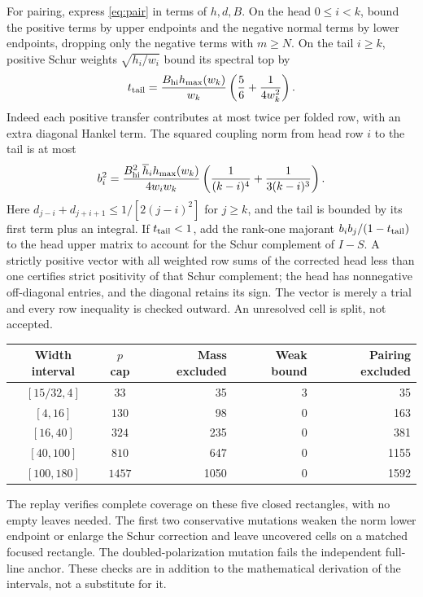 \documentclass[11pt]{article}
\begin{document}
For pairing, express \eqref{eq:pair} in terms of $h,d,B$. On the head $0\le i<k$, bound the positive terms by upper endpoints and the negative normal terms by lower endpoints, dropping only the negative terms with $m\ge N$. On the tail $i\ge k$, positive Schur weights $\sqrt{h_i/w_i}$ bound its spectral top by
\[
 t_{\rm tail}=\frac{B_{\rm hi} h_{\max}(w_k)}{w_k}
          \left(\frac56+\frac1{4w_k^2}\right).
\]
Indeed each positive transfer contributes at most twice per folded row, with an extra diagonal Hankel term. The squared coupling norm from head row $i$ to the tail is at most
\[
 b_i^2=\frac{B_{\rm hi}^2\,\overline h_i h_{\max}(w_k)}{4w_iw_k}
         \left(\frac1{(k-i)^4}+\frac1{3(k-i)^3}\right).
\]
Here $d_{j-i}+d_{j+i+1}\le1/[2(j-i)^2]$ for $j\ge k$, and the tail is bounded by its first term plus an integral. If $t_{\rm tail}<1$, add the rank-one majorant $b_i b_j/(1-t_{\rm tail})$ to the head upper matrix to account for the Schur complement of $I-S$. A strictly positive vector with all weighted row sums of the corrected head less than one certifies strict positivity of that Schur complement; the head has nonnegative off-diagonal entries, and the diagonal retains its sign. The vector is merely a trial and every row inequality is checked outward. An unresolved cell is split, not accepted.

\begin{center}
\begin{tabular}{ccrrr}
\toprule
Width interval & $p$ cap & Mass excluded & Weak bound & Pairing excluded\\
\midrule
$[15/32,4]$ & $33$   & 35   & 3 & 35\\
$[4,16]$ & $130$     & 98   & 0 & 163\\
$[16,40]$ & $324$    & 235  & 0 & 381\\
$[40,100]$ & $810$   & 647  & 0 & 1155\\
$[100,180]$ & $1457$ & 1050 & 0 & 1592\\
\bottomrule
\end{tabular}
\end{center}
The replay verifies complete coverage on these five closed rectangles, with no empty leaves needed. The first two conservative mutations weaken the norm lower endpoint or enlarge the Schur correction and leave uncovered cells on a matched focused rectangle. The doubled-polarization mutation fails the independent full-line anchor. These checks are in addition to the mathematical derivation of the intervals, not a substitute for it.
\end{document}
